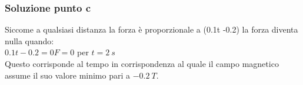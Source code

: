 \documentclass[../../main.tex]{subfiles}
\begin{document}
\subsubsection*{Soluzione punto c}
Siccome a qualsiasi distanza la forza è proporzionale a (0.1t -0.2) la forza diventa nulla quando:\\
$0.1t-0.2 = 0$\tab\tab $F=0$ per $t=2\ s$\\
Questo corrisponde al tempo in corrispondenza al quale il campo magnetico assume il suo valore minimo pari a $-0.2\ T$.
\newpage
\end{document}
